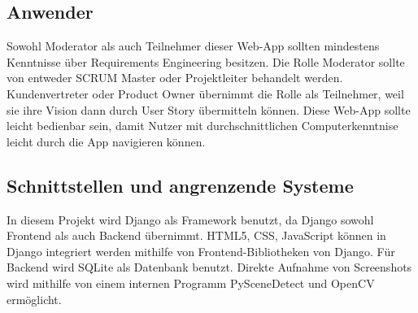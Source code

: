 \subsection{Anwender}
Sowohl Moderator als auch Teilnehmer dieser Web-App sollten mindestens Kenntnisse über Requirements Engineering besitzen. Die Rolle Moderator sollte von entweder SCRUM Master
oder Projektleiter behandelt werden. Kundenvertreter oder Product Owner übernimmt die Rolle als Teilnehmer, weil sie ihre Vision dann durch User Story übermitteln können. 
Diese Web-App sollte leicht bedienbar sein, damit Nutzer mit durchschnittlichen Computerkenntnise leicht durch die App navigieren können.

\subsection{Schnittstellen und angrenzende Systeme} 

In diesem Projekt wird Django als Framework benutzt, da Django sowohl Frontend als auch Backend übernimmt. HTML5, CSS, JavaScript können in Django integriert werden mithilfe 
von Frontend-Bibliotheken von Django. Für Backend wird SQLite als Datenbank benutzt. Direkte Aufnahme von Screenshots wird mithilfe von einem internen Programm PySceneDetect 
und OpenCV ermöglicht.
